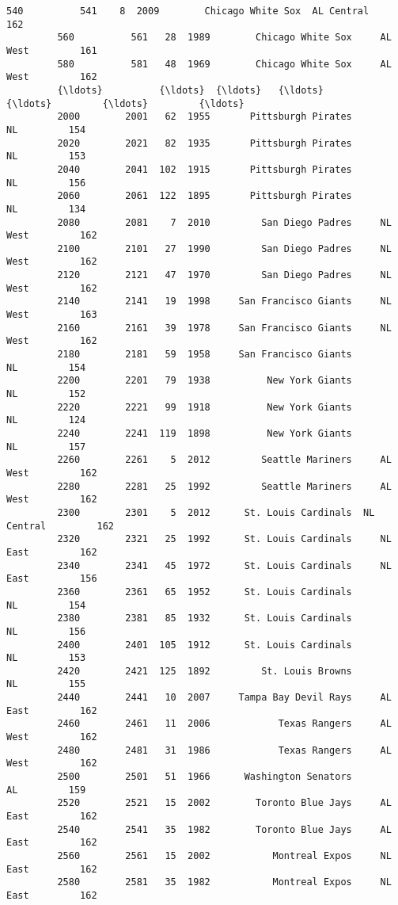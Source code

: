 \documentclass[11pt]{article}
\begin{document}
\begin{Verbatim}[commandchars=\\\{\}]
         540          541    8  2009        Chicago White Sox  AL Central         162   
         560          561   28  1989        Chicago White Sox     AL West         161   
         580          581   48  1969        Chicago White Sox     AL West         162   
         {\ldots}          {\ldots}  {\ldots}   {\ldots}                      {\ldots}         {\ldots}         {\ldots}   
         2000        2001   62  1955       Pittsburgh Pirates          NL         154   
         2020        2021   82  1935       Pittsburgh Pirates          NL         153   
         2040        2041  102  1915       Pittsburgh Pirates          NL         156   
         2060        2061  122  1895       Pittsburgh Pirates          NL         134   
         2080        2081    7  2010         San Diego Padres     NL West         162   
         2100        2101   27  1990         San Diego Padres     NL West         162   
         2120        2121   47  1970         San Diego Padres     NL West         162   
         2140        2141   19  1998     San Francisco Giants     NL West         163   
         2160        2161   39  1978     San Francisco Giants     NL West         162   
         2180        2181   59  1958     San Francisco Giants          NL         154   
         2200        2201   79  1938          New York Giants          NL         152   
         2220        2221   99  1918          New York Giants          NL         124   
         2240        2241  119  1898          New York Giants          NL         157   
         2260        2261    5  2012         Seattle Mariners     AL West         162   
         2280        2281   25  1992         Seattle Mariners     AL West         162   
         2300        2301    5  2012      St. Louis Cardinals  NL Central         162   
         2320        2321   25  1992      St. Louis Cardinals     NL East         162   
         2340        2341   45  1972      St. Louis Cardinals     NL East         156   
         2360        2361   65  1952      St. Louis Cardinals          NL         154   
         2380        2381   85  1932      St. Louis Cardinals          NL         156   
         2400        2401  105  1912      St. Louis Cardinals          NL         153   
         2420        2421  125  1892         St. Louis Browns          NL         155   
         2440        2441   10  2007     Tampa Bay Devil Rays     AL East         162   
         2460        2461   11  2006            Texas Rangers     AL West         162   
         2480        2481   31  1986            Texas Rangers     AL West         162   
         2500        2501   51  1966      Washington Senators          AL         159   
         2520        2521   15  2002        Toronto Blue Jays     AL East         162   
         2540        2541   35  1982        Toronto Blue Jays     AL East         162   
         2560        2561   15  2002           Montreal Expos     NL East         162   
         2580        2581   35  1982           Montreal Expos     NL East         162   
         

\end{Verbatim}
\end{document}
